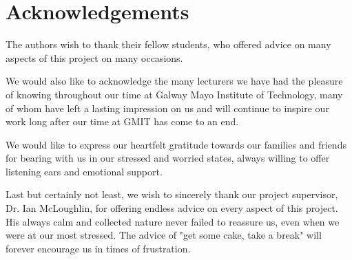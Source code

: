 \chapter*{Acknowledgements}
The authors wish to thank their fellow students, who offered advice on many aspects of this project on many occasions. 

We would also like to acknowledge the many lecturers we have had the pleasure of knowing throughout our time at Galway Mayo Institute of Technology, many of whom have left a lasting impression on us and will continue to inspire our work long after our time at GMIT has come to an end. 

We would like to express our heartfelt gratitude towards our families and friends for bearing with us in our stressed and worried states, always willing to offer listening ears and emotional support.

Last but certainly not least, we wish to sincerely thank our project supervisor, Dr. Ian McLoughlin, for offering endless advice on every aspect of this project. His always calm and collected nature never failed to reassure us, even when we were at our most stressed. The advice of "get some cake, take a break" will forever encourage us in times of frustration.






